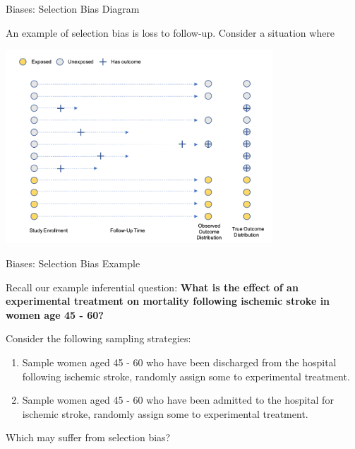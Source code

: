 \documentclass[ignorenonframetext,]{beamer}
\providecommand{\tightlist}{%
  \setlength{\itemsep}{0pt}\setlength{\parskip}{0pt}}
\begin{document}
\begin{frame}{Biases: Selection Bias Diagram}
\protect\hypertarget{biases-selection-bias-diagram}{}

An example of selection bias is loss to follow-up. Consider a situation
where

\includegraphics[width=0.75\textwidth,height=\textheight]{../media/loss-to-followup.png}

\end{frame}

\begin{frame}{Biases: Selection Bias Example}
\protect\hypertarget{biases-selection-bias-example}{}

Recall our example inferential question: \textbf{What is the effect of
an experimental treatment on mortality following ischemic stroke in
women age 45 - 60?}

Consider the following sampling strategies:

\begin{enumerate}
\tightlist
\item
  Sample women aged 45 - 60 who have been discharged from the hospital
  following ischemic stroke, randomly assign some to experimental
  treatment.
\item
  Sample women aged 45 - 60 who have been admitted to the hospital for
  ischemic stroke, randomly assign some to experimental treatment.
\end{enumerate}

Which may suffer from selection bias?

\end{frame}
\end{document}
